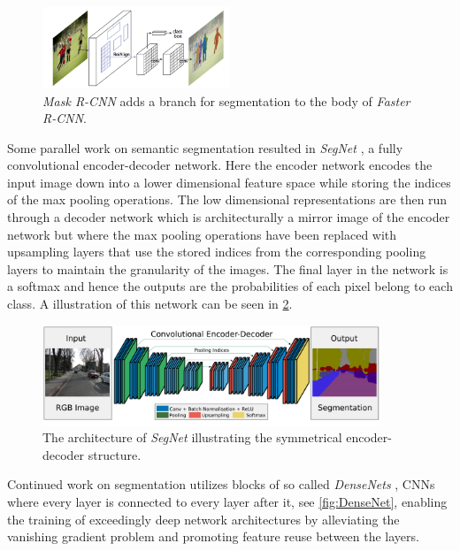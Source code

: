\documentclass{kththesis}
\newcommand{\bibentry}[1]{\parencite{#1}}
\begin{document}
\begin{figure}[h]
  \centering
  \includegraphics[width=0.5\textwidth]{MaskR-CNN}
  \caption{\textit{Mask R-CNN} adds a branch for segmentation to the body of
    \textit{Faster R-CNN}.}
  \label{fig:AlexNet}
  \end{figure}

Some parallel work on semantic segmentation resulted in \emph{SegNet}
\bibentry{badrinarayanan2015segnet}, a fully convolutional encoder-decoder
network. Here the encoder network encodes the input image down into a lower
dimensional feature space while storing the indices of the max pooling
operations. The low dimensional representations are then run through a decoder
network which is architecturally a mirror image of the encoder network but where
the max pooling operations have been replaced with upsampling layers that use
the stored indices from the corresponding pooling layers to maintain the
granularity of the images. The final layer in the network is a softmax and hence
the outputs are the probabilities of each pixel belong to each class. A
illustration of this network can be seen in \cref{fig:SegNet}.

\begin{figure}[h]
  \centering
  \includegraphics[width=0.9\textwidth]{SegNet}
  \caption{The architecture of \textit{SegNet} illustrating the symmetrical
    encoder-decoder structure.}
  \label{fig:SegNet}
  \end{figure}

Continued work on segmentation utilizes blocks of so called \emph{DenseNets}
\bibentry{huang2017densely}, CNNs where every layer is connected to every layer
after it, see \cref{fig:DenseNet}, enabling the training of exceedingly deep network architectures by
alleviating the vanishing gradient problem and promoting feature reuse between
the layers.
\end{document}
